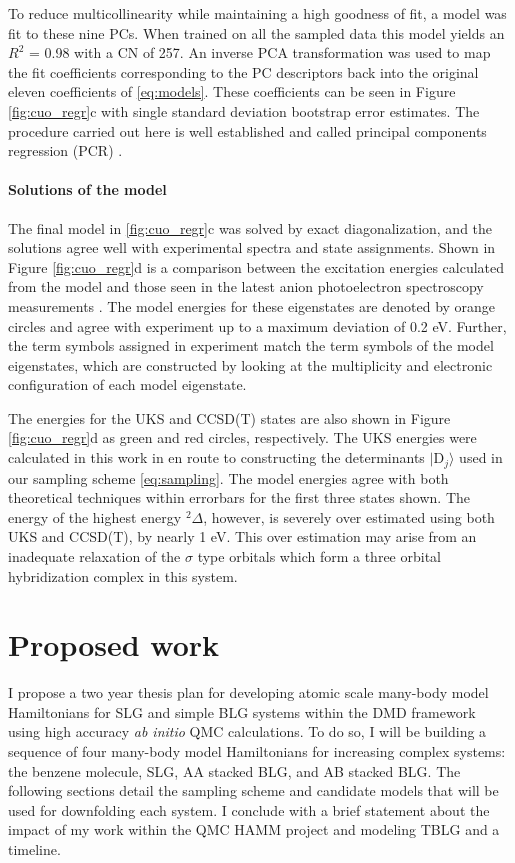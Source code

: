 \documentclass[12pt]{article}
\begin{document}
To reduce multicollinearity while maintaining a high goodness of fit, a model was fit to these nine PCs.
When trained on all the sampled data this model yields an $R^2$ = 0.98 with a CN of 257. 
An inverse PCA transformation was used to map the fit coefficients corresponding to the PC descriptors back into the original eleven coefficients of \eqref{eq:models}.
These coefficients can be seen in Figure \ref{fig:cuo_regr}c with single standard deviation bootstrap error estimates.
The procedure carried out here is well established and called principal components regression (PCR) \cite{10.2307/2348005}.

\vspace{-10pt}
\paragraph{Solutions of the model}
The final model in \ref{fig:cuo_regr}c was solved by exact diagonalization, and the solutions agree well with experimental spectra and state assignments.
Shown in Figure \ref{fig:cuo_regr}d is a comparison between the excitation energies calculated from the model and those seen in the latest anion photoelectron spectroscopy measurements \cite{Wu1997}.
The model energies for these eigenstates are denoted by orange circles and agree with experiment up to a maximum deviation of 0.2 eV.
Further, the term symbols assigned in experiment match the term symbols of the model eigenstates, which are constructed by looking at the multiplicity and electronic configuration of each model eigenstate. 

The energies for the UKS and CCSD(T) \cite{Xian2000} states are also shown in Figure \ref{fig:cuo_regr}d as green and red circles, respectively.
The UKS energies were calculated in this work in en route to constructing the determinants $|\text{D}_j\rangle$ used in our sampling scheme \eqref{eq:sampling}.
The model energies agree with both theoretical techniques within errorbars for the first three states shown.
The energy of the highest energy $^2\Delta$, however, is severely over estimated using both UKS and CCSD(T), by nearly 1 eV.
This over estimation may arise from an inadequate relaxation of the $\sigma$ type orbitals which form a three orbital hybridization complex in this system.

\section{Proposed work}
I propose a two year thesis plan for developing atomic scale many-body
model Hamiltonians for SLG and simple BLG systems within the DMD framework using high accuracy \textit{ab initio} QMC calculations.
To do so, I will be building a sequence of four many-body model Hamiltonians for increasing complex systems: the benzene molecule, SLG, AA stacked BLG, and AB stacked BLG.
The following sections detail the sampling scheme and candidate models that will be used for downfolding each system.
I conclude with a brief statement about the impact of my work within the QMC HAMM project and modeling TBLG and a timeline.
\end{document}
